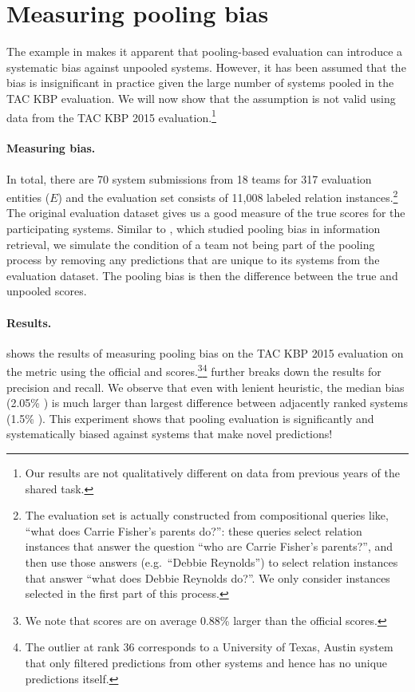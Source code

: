 \section{Measuring pooling bias}
\label{sec:kbpo:analysis}

The example in  makes it apparent that pooling-based evaluation can introduce a systematic bias against unpooled systems.
However, it has been assumed that the bias is insignificant in practice given the large number of systems pooled in the TAC KBP evaluation.
We will now show that the assumption is not valid using data from the TAC KBP 2015 evaluation.\footnote{%
Our results are not qualitatively different on data from previous years of the shared task.}

\paragraph{Measuring bias.}
In total, there are 70 system submissions from 18 teams for 317 evaluation entities ($E$) and the evaluation set consists of 11,008 labeled relation instances.\footnote{%
  The evaluation set is actually constructed from compositional queries like, ``what does Carrie Fisher's parents do?'':
  these queries select relation instances that answer the question ``who are Carrie Fisher's parents?'', and then use those answers (e.g.\ ``Debbie Reynolds'') to select relation instances that answer ``what does Debbie Reynolds do?''.
  We only consider instances selected in the first part of this process.
}
The original evaluation dataset gives us a good measure of the true scores for the participating systems.
Similar to \citet{zobel1998reliable}, which studied pooling bias in information retrieval,
we simulate the condition of a team not being part of the pooling process by removing any predictions that are unique to its systems from the evaluation dataset.
The pooling bias is then the difference between the true and unpooled scores.

\paragraph{Results.}
 shows the results of measuring pooling bias on the TAC KBP 2015 evaluation on the \fone{} metric using the official and \anydoc{} scores.\footnote{%
  We note that \anydoc{} scores are on average 0.88\%\fone{} larger than the official scores. 
  }\footnote{
  The outlier at rank 36 corresponds to a University of Texas, Austin system that only filtered predictions from other systems and hence has no unique predictions itself.
  }
 further breaks down the results for precision and recall.
We observe that even with lenient \anydoc{} heuristic, the median bias (2.05\% \fone{}) is much larger than largest difference between adjacently ranked systems (1.5\% \fone{}).
This experiment shows that pooling evaluation is significantly and systematically biased against systems that make novel predictions!

